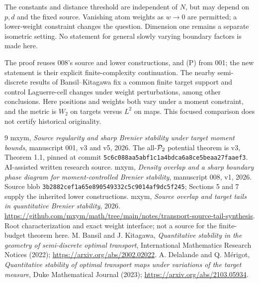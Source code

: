 \documentclass[11pt]{article}
\theoremstyle{remark}\newtheorem{remark}[theorem]{Remark}
\begin{document}
The constants and distance threshold are independent of $N$, but may depend on $p,d$ and the fixed source. Vanishing atom weights as $w\to0$ are permitted; a lower-weight constraint changes the question. Dimension one remains a separate isometric setting. No statement for general slowly varying boundary factors is made here.

The proof reuses 008's source and lower constructions, and (P) from 001; the new statement is their explicit finite-complexity continuation. The nearby semi-discrete results of Bansil--Kitagawa fix a common finite target support and control Laguerre-cell changes under weight perturbations, among other conclusions. Here positions and weights both vary under a moment constraint, and the metric is $W_2$ on targets versus $L^2$ on maps. This focused comparison does not certify historical originality.

\begin{thebibliography}{9}
 mxym, \emph{Source regularity and sharp Brenier stability under target moment bounds}, manuscript 001, v3 and v5, 2026. The all-$\mathcal P_2$ potential theorem is v3, Theorem 1.1, pinned at commit \texttt{5c6c088aa5abf1c1a4bdca6a8ce5beaa27faaef3}. AI-assisted written research source.
 mxym, \emph{Density overlap and a sharp boundary phase diagram for moment-controlled Brenier stability}, manuscript 008, v1, 2026. Source blob \texttt{3b2882cef1a65e890549332c5c9014af9dc5f245}; Sections 5 and 7 supply the inherited lower constructions.
 mxym, \emph{Source overlap and target tails in quantitative Brenier stability}, 2026. \url{https://github.com/mxym/math/tree/main/notes/transport-source-tail-synthesis}. Root characterization and exact weight interface; not a source for the finite-budget theorem here.
 M. Bansil and J. Kitagawa, \emph{Quantitative stability in the geometry of semi-discrete optimal transport}, International Mathematics Research Notices (2022); \url{https://arxiv.org/abs/2002.02022}.
 A. Delalande and Q. M\'erigot, \emph{Quantitative stability of optimal transport maps under variations of the target measure}, Duke Mathematical Journal (2023); \url{https://arxiv.org/abs/2103.05934}.
\end{thebibliography}
\end{document}
